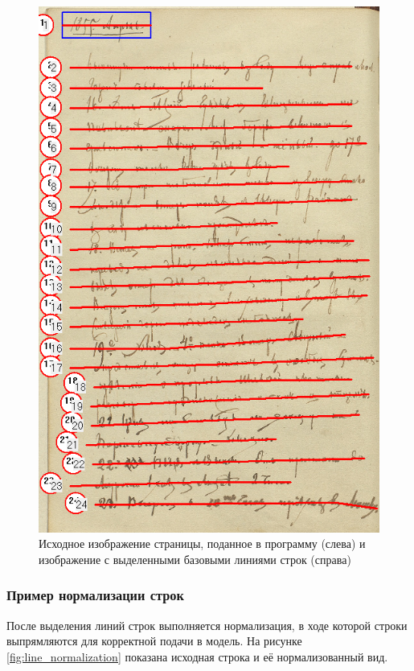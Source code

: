 \documentclass{extarticle}
\begin{document}
\begin{figure}[H]
\begin{minipage}{0.49\textwidth}
		\includegraphics[width=\textwidth]{images/нарезка_на_строки_2.png}
	\end{minipage}
	\caption{Исходное изображение страницы, поданное в программу (слева) и изображение с выделенными базовыми линиями строк (справа)}
	\label{fig:line_detection_1_2}
\end{figure}

\subsubsection{Пример нормализации строк}

После выделения линий строк выполняется нормализация, в ходе которой строки выпрямляются для корректной подачи в модель. На рисунке \ref{fig:line_normalization} показана исходная строка и её нормализованный вид.
\end{document}
